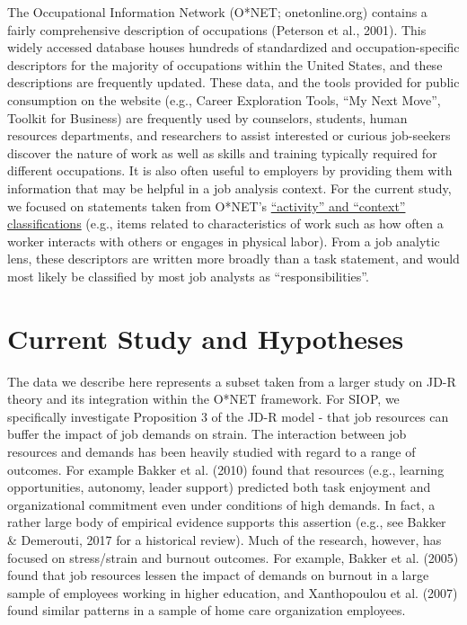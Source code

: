 \documentclass[
  man]{apa6}
\begin{document}
The Occupational Information Network (O*NET; onetonline.org) contains a fairly comprehensive description of occupations (Peterson et al., 2001). This widely accessed database houses hundreds of standardized and occupation-specific descriptors for the majority of occupations within the United States, and these descriptions are frequently updated. These data, and the tools provided for public consumption on the website (e.g., Career Exploration Tools, ``My Next Move'', Toolkit for Business) are frequently used by counselors, students, human resources departments, and researchers to assist interested or curious job-seekers discover the nature of work as well as skills and training typically required for different occupations. It is also often useful to employers by providing them with information that may be helpful in a job analysis context. For the current study, we focused on statements taken from O*NET's \href{https://www.O*NETonline.org/find/descriptor/result/4.A.1.b.3}{``activity'' and ``context'' classifications} (e.g., items related to characteristics of work such as how often a worker interacts with others or engages in physical labor). From a job analytic lens, these descriptors are written more broadly than a task statement, and would most likely be classified by most job analysts as ``responsibilities''.

\hypertarget{current-study-and-hypotheses}{%
\section{Current Study and Hypotheses}\label{current-study-and-hypotheses}}

The data we describe here represents a subset taken from a larger study on JD-R theory and its integration within the O*NET framework. For SIOP, we specifically investigate Proposition 3 of the JD-R model - that job resources can buffer the impact of job demands on strain. The interaction between job resources and demands has been heavily studied with regard to a range of outcomes. For example Bakker et al. (2010) found that resources (e.g., learning opportunities, autonomy, leader support) predicted both task enjoyment and organizational commitment even under conditions of high demands. In fact, a rather large body of empirical evidence supports this assertion (e.g., see Bakker \& Demerouti, 2017 for a historical review). Much of the research, however, has focused on stress/strain and burnout outcomes. For example, Bakker et al. (2005) found that job resources lessen the impact of demands on burnout in a large sample of employees working in higher education, and Xanthopoulou et al. (2007) found similar patterns in a sample of home care organization employees.
\end{document}
